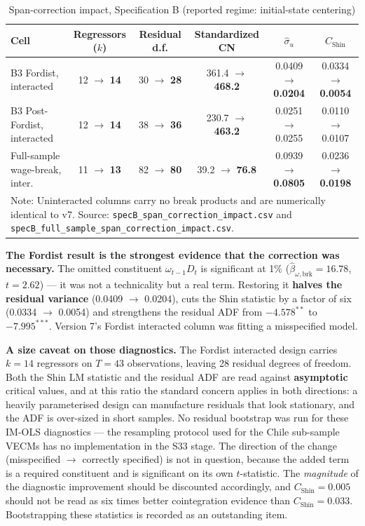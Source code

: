 \documentclass[11pt,a4paper]{article}
\begin{document}
\begin{table}[H]
\centering
\caption{Span-correction impact, Specification B (reported regime: initial-state centering)}
\label{tab:specB_span_impact}
\small
\begin{tabular}{p{5.0cm}ccccc}
\toprule
Cell & Regressors ($k$) & Residual d.f. & Standardized CN & $\hat{\sigma}_u$ & $C_{\text{Shin}}$ \\
\midrule
B3 Fordist, interacted & 12 $\to$ \textbf{14} & 30 $\to$ \textbf{28} & 361.4 $\to$ \textbf{468.2} & 0.0409 $\to$ \textbf{0.0204} & 0.0334 $\to$ \textbf{0.0054} \\
B3 Post-Fordist, interacted & 12 $\to$ \textbf{14} & 38 $\to$ \textbf{36} & 230.7 $\to$ \textbf{463.2} & 0.0251 $\to$ 0.0255 & 0.0110 $\to$ 0.0107 \\
Full-sample wage-break, inter. & 11 $\to$ \textbf{13} & 82 $\to$ \textbf{80} & 39.2 $\to$ \textbf{76.8} & 0.0939 $\to$ \textbf{0.0805} & 0.0236 $\to$ \textbf{0.0198} \\
\bottomrule
\multicolumn{6}{p{15.5cm}}{\footnotesize Note: Uninteracted columns carry no break products and are numerically identical to v7. Source: \texttt{specB\_span\_correction\_impact.csv} and \texttt{specB\_full\_sample\_span\_correction\_impact.csv}.}
\end{tabular}
\end{table}

\textbf{The Fordist result is the strongest evidence that the correction was necessary.} The omitted constituent $\omega_{t-1}D_t$ is significant at 1\% ($\hat{\beta}_{\omega,\text{brk}} = 16.78$, $t = 2.62$) --- it was not a technicality but a real term. Restoring it \textbf{halves the residual variance} (0.0409 $\to$ 0.0204), cuts the Shin statistic by a factor of six (0.0334 $\to$ 0.0054) and strengthens the residual ADF from $-4.578^{**}$ to $-7.995^{***}$. Version 7's Fordist interacted column was fitting a misspecified model.

\textbf{A size caveat on those diagnostics.} The Fordist interacted design carries $k = 14$ regressors on $T = 43$ observations, leaving 28 residual degrees of freedom. Both the Shin LM statistic and the residual ADF are read against \textbf{asymptotic} critical values, and at this ratio the standard concern applies in both directions: a heavily parameterised design can manufacture residuals that look stationary, and the ADF is over-sized in short samples. No residual bootstrap was run for these IM-OLS diagnostics --- the resampling protocol used for the Chile sub-sample VECMs has no implementation in the S33 stage. The direction of the change (misspecified $\to$ correctly specified) is not in question, because the added term is a required constituent and is significant on its own $t$-statistic. The \textit{magnitude} of the diagnostic improvement should be discounted accordingly, and $C_{\text{Shin}} = 0.005$ should not be read as six times better cointegration evidence than $C_{\text{Shin}} = 0.033$. Bootstrapping these statistics is recorded as an outstanding item.
\end{document}
